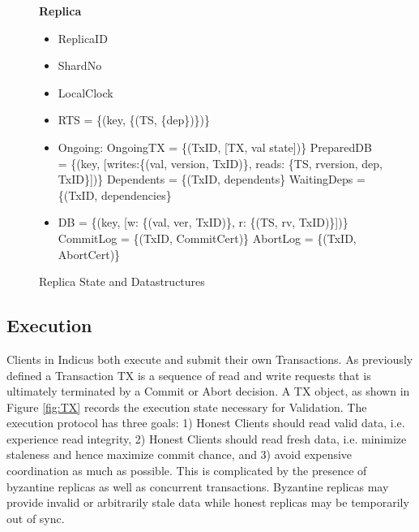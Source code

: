 \newcommand{\SubItem}[1]{
    {\setlength\itemindent{15pt} \item[-] #1}
}

\begin{figure}[t]
  \begin{mdframed}[roundcorner=10pt]
 	\textbf{Replica }
 	\begin{itemize}
 	\item ReplicaID
 	\item ShardNo
 	\item LocalClock
 	\item RTS = \{(key, \{(TS, \{dep\})\})\}
 	\item Ongoing:
 	\subitem OngoingTX = \{(TxID, [TX, val state])\}
 	\subitem PreparedDB = \{(key, [writes:\{(val, version, TxID)\},  reads: \{TS, rversion, dep, TxID\}])\}
 	\subitem Dependents = \{(TxID, dependents\}
 	\subitem WaitingDeps = \{(TxID, dependencies\}
 	\item DB = \{(key, [w: \{(val, ver, TxID)\}, r: \{(TS, rv, TxID)\}])\}
 	\subitem CommitLog = \{(TxID, CommitCert)\}
 	\subitem AbortLog = \{(TxID, AbortCert)\}
	 	
 	
 	\end{itemize}
  \end{mdframed}
  \caption{Replica State and Datastructures}
  \label{fig:RS}
\end{figure}



\subsection{Execution}

Clients in Indicus both execute and submit their own Transactions. As previously defined a Transaction TX is a sequence of read and write requests that is ultimately terminated by a Commit or Abort decision. A TX object, as shown in Figure \ref{fig:TX} records the execution state necessary for Validation. The execution protocol has three goals: 1) Honest Clients should read valid data, i.e. experience read integrity, 2) Honest Clients should read fresh data, i.e. minimize staleness and hence maximize commit chance, and 3) avoid expensive coordination as much as possible. This is complicated by the presence of byzantine replicas as well as concurrent transactions. Byzantine replicas may provide invalid or arbitrarily stale data while honest replicas may be temporarily out of sync.

